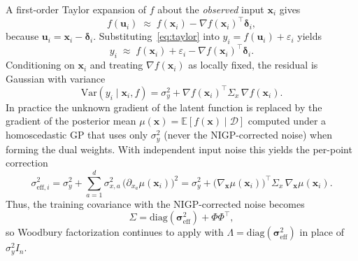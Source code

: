 \documentclass[11pt]{article}
\newcommand{\Sig}{\Sigma}
\newcommand{\Ph}{\Phi}
\newcommand{\gradmu}{\nabla_{\mathbf{x}}\mu}
\newcommand{\Sigx}{\Sigma_{x}}
\newcommand{\noisey}{\sigma_y^{2}}
\newcommand{\di}{\sigma_{\mathrm{eff},i}^{2}}
\newcommand{\seffvec}{\boldsymbol{\sigma}_{\mathrm{eff}}^{2}}
\begin{document}
A first-order Taylor expansion of $f$ about the \emph{observed} input $\mathbf{x}_i$
gives
\begin{equation}
\label{eq:taylor}
  f(\mathbf{u}_i)
  \;\approx\;
  f(\mathbf{x}_i)
  -
  \nabla f(\mathbf{x}_i)^{\!\top}
  \boldsymbol{\delta}_i,
\end{equation}
because $\mathbf{u}_i=\mathbf{x}_i-\boldsymbol{\delta}_i$.
Substituting~\eqref{eq:taylor} into $y_i=f(\mathbf{u}_i)+\varepsilon_i$ yields
\begin{equation}
\label{eq:lin-obs}
  y_i
  \;\approx\;
  f(\mathbf{x}_i)
  +
  \varepsilon_i
  -
  \nabla f(\mathbf{x}_i)^{\!\top}
  \boldsymbol{\delta}_i.
\end{equation}
Conditioning on $\mathbf{x}_i$ and treating $\nabla f(\mathbf{x}_i)$ as locally fixed,
the residual is Gaussian with variance
\begin{equation}
\label{eq:d-exact}
  \mathrm{Var}(y_i\mid\mathbf{x}_i,f)
  =
  \noisey
  +
  \nabla f(\mathbf{x}_i)^{\!\top}
  \Sigx\,
  \nabla f(\mathbf{x}_i).
\end{equation}
In practice the unknown gradient of the latent function is replaced by the gradient of
the posterior mean $\mu(\mathbf{x})=\mathbb{E}[f(\mathbf{x})\mid\mathcal{D}]$ computed
under a homoscedastic GP that uses only $\noisey$ (never the NIGP-corrected
noise) when forming the dual weights.
With independent input noise this yields the per-point correction~\cite{mchutchon2011nigp}
\begin{equation}
\label{eq:seff}
  \di
  =
  \noisey
  +
  \sum_{a=1}^{d}
  \sigma_{x,a}^{2}\,
  \bigl(\partial_{x_a}\mu(\mathbf{x}_i)\bigr)^{2}
  =
  \noisey
  +
  \bigl(\gradmu(\mathbf{x}_i)\bigr)^{\!\top}
  \Sigx\,
  \gradmu(\mathbf{x}_i).
\end{equation}
Thus, the training covariance with the NIGP-corrected noise becomes
\begin{equation}
\label{eq:nigp-sigma}
  \Sig
  =
  \mathrm{diag}(\seffvec)
  +
  \Ph\Ph^{\top},
\end{equation}
so Woodbury factorization continues to apply with $\Lambda=\mathrm{diag}(\seffvec)$ in place of
$\noisey I_n$.
\end{document}

